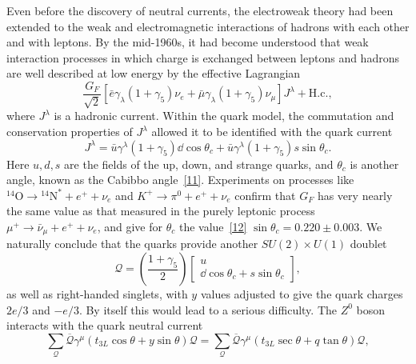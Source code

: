 Even before the discovery of neutral currents, the electroweak theory had been extended to the weak and electromagnetic interactions of hadrons with each other and with leptons. By the mid-1960s, it had become understood that weak interaction processes in which charge is exchanged between leptons and hadrons are well described at low energy by the effective Lagrangian
\begin{equation}
\frac{G_F}{\sqrt{2}}
\left[
\bar e\gamma_\lambda(1+\gamma_5)\nu_e
+\bar\mu\gamma_\lambda(1+\gamma_5)\nu_\mu
\right]J^\lambda+\mathrm{H.c.},
\tag{21.3.39}\label{eq:21.3.39}
\end{equation}
where $J^\lambda$ is a hadronic current. Within the quark model, the commutation and conservation properties of $J^\lambda$ allowed it to be identified with the quark current
\begin{equation}
J^\lambda
=\bar u\gamma^\lambda(1+\gamma_5)\dd\cos\theta_c
+\bar u\gamma^\lambda(1+\gamma_5)s\sin\theta_c.
\tag{21.3.40}\label{eq:21.3.40}
\end{equation}
Here $u,d,s$ are the fields of the up, down, and strange quarks, and $\theta_c$ is another angle, known as the Cabibbo angle~\hyperref[ch21-ref-11]{[11]}. Experiments on processes like ${}^{14}\mathrm O\to{}^{14}\mathrm N^*+e^++\nu_e$ and $K^+\to\pi^0+e^++\nu_e$ confirm that $G_F$ has very nearly the same value as that measured in the purely leptonic process $\mu^+\to\bar\nu_\mu+e^++\nu_e$, and give for $\theta_c$ the value~\hyperref[ch21-ref-12]{[12]} $\sin\theta_c=0.220\mathbin{\pm}0.003$. We naturally conclude that the quarks provide another $SU(2)\times U(1)$ doublet
\begin{equation}
\mathcal{Q}
=\left(\frac{1+\gamma_5}{2}\right)
\begin{bmatrix}
u\\
\dd\cos\theta_c+s\sin\theta_c
\end{bmatrix},
\tag{21.3.41}\label{eq:21.3.41}
\end{equation}
as well as right-handed singlets, with $y$ values adjusted to give the quark charges $2e/3$ and $-e/3$. By itself this would lead to a serious difficulty. The $Z^0$ boson interacts with the quark neutral current
\begin{equation}
\sum_{\mathcal Q}
\overline{\mathcal Q}\gamma^\mu
(t_{3L}\cos\theta+y\sin\theta)\mathcal Q
=
\sum_{\mathcal Q}
\overline{\mathcal Q}\gamma^\mu
(t_{3L}\sec\theta+q\tan\theta)\mathcal Q,
\tag{21.3.42}\label{eq:21.3.42}
\end{equation}
